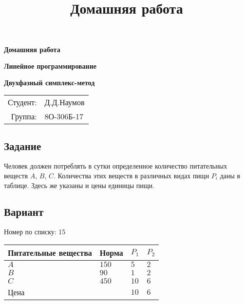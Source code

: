 \documentclass{article}
\title{Домашняя работа}
\date{}
\begin{document}
\begin{titlepage}

\vspace{100pt}
\begin{center}
    \huge \textbf{Домашняя работа}

    \vspace{50pt}
    
    \huge \textbf{Линейное программирование}
    
    \vspace{30pt}
    
    \huge \textbf{Двухфазный симплекс-метод}
\end{center}
\begin{flushright}

\vspace{350pt}
\begin{tabular}{rl}
     \Large Студент: & \Large Д.Д.Наумов \\
     \Large Группа: & \Large 8О-306Б-17 \\
\end{tabular}
\end{flushright}
\end{titlepage}

\setcounter{section}{0}
\subsection*{Задание}
Человек должен потреблять в сутки определенное количество питательных веществ $A$, $B$, $C$.
Количества этих веществ в различных видах пищи $P_i$ даны в таблице. Здесь же указаны и цены единицы пищи.

\subsection*{Вариант}
Номер по списку: 15

\begin{tabular}{| l | l | l | l |}
    \hline
    Питательные вещества & Норма & $P_1$ & $P_2$ \\
    \hline
    $A$ & $150$ & $5$ & $2$ \\
    \hline
    $B$ & $90$ & $1$ & $2$ \\
    \hline
    $C$ & $450$ & $10$ & $6$ \\
    \hline
    Цена & & $10$ & $6$ \\
    \hline
\end{tabular}

\pagebreak
\end{document}
